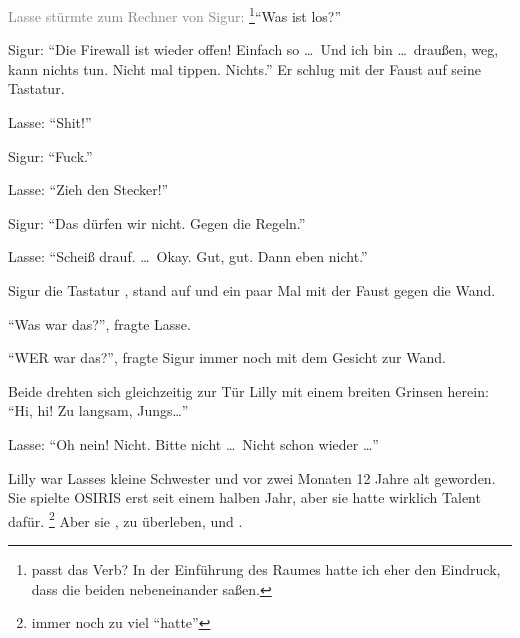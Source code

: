 \textcolor{gray}{Lasse stürmte zum Rechner von Sigur:} \footnote{passt das Verb? In der Einführung des Raumes hatte ich eher den Eindruck, dass die beiden nebeneinander saßen.}\enquote{Was ist los?}

Sigur: \enquote{Die Firewall ist wieder offen! Einfach so \dots\  Und ich bin \dots\  draußen, weg, kann nichts tun.
Nicht mal tippen.
Nichts.} Er schlug mit der Faust auf seine Tastatur.

Lasse: \enquote{Shit!}

Sigur: \enquote{Fuck.}

Lasse: \enquote{Zieh den Stecker!}

Sigur: \enquote{Das dürfen wir nicht.
Gegen die Regeln.}

Lasse: \enquote{Scheiß drauf.
\dots\  Okay.
Gut, gut.
Dann eben nicht.} 

Sigur  die Tastatur , stand auf und  ein paar Mal mit der Faust gegen die Wand.

\enquote{Was war das?}, fragte Lasse.

\enquote{WER war das?}, fragte Sigur immer noch mit dem Gesicht zur Wand.

Beide drehten sich gleichzeitig zur Tür Lilly  mit einem breiten Grinsen herein: \enquote{Hi, hi! Zu langsam, Jungs\dots}

Lasse: \enquote{Oh nein! Nicht.
Bitte nicht \dots\  Nicht schon wieder \dots} 

Lilly war Lasses kleine Schwester und vor zwei Monaten 12 Jahre alt geworden.
Sie spielte OSIRIS erst seit einem halben Jahr, aber sie hatte wirklich Talent dafür.
\footnote{immer noch zu viel \enquote{hatte}}
Aber sie , zu überleben, und .

